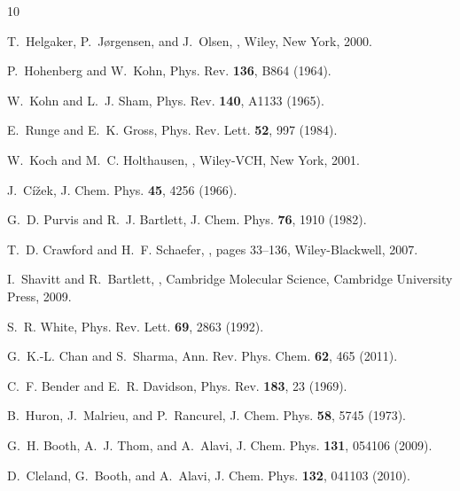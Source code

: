 \documentclass[aps,prl,twocolumn,showpacs,superscriptaddress,groupedaddress]{revtex4}  %
\begin{document}
% 
% 
\begin{thebibliography}{10}

T.~Helgaker, P.~J\o{}rgensen, and J.~Olsen,
,
\newblock Wiley, New York, 2000.

P.~Hohenberg and W.~Kohn,
\newblock Phys. Rev. {\bf 136}, B864 (1964).

W.~Kohn and L.~J. Sham,
\newblock Phys. Rev. {\bf 140}, A1133 (1965).

E.~Runge and E.~K. Gross,
\newblock Phys. Rev. Lett. {\bf 52}, 997 (1984).

W.~Koch and M.~C. Holthausen,
,
\newblock Wiley-VCH, New York, 2001.

J.~C\'i\v{z}ek,
\newblock J. Chem. Phys. {\bf 45}, 4256 (1966).

G.~D. Purvis and R.~J. Bartlett,
\newblock J. Chem. Phys. {\bf 76}, 1910 (1982).

T.~D. Crawford and H.~F. Schaefer,
, pages 33--136,
\newblock Wiley-Blackwell, 2007.

I.~Shavitt and R.~Bartlett,
,
\newblock Cambridge Molecular Science, Cambridge University Press, 2009.

S.~R. White,
\newblock Phys. Rev. Lett. {\bf 69}, 2863 (1992).

G.~K.-L. Chan and S.~Sharma,
\newblock Ann. Rev. Phys. Chem. {\bf 62}, 465 (2011).

C.~F. Bender and E.~R. Davidson,
\newblock Phys. Rev. {\bf 183}, 23 (1969).

B.~Huron, J.~Malrieu, and P.~Rancurel,
\newblock J. Chem. Phys. {\bf 58}, 5745 (1973).

G.~H. Booth, A.~J. Thom, and A.~Alavi,
\newblock J. Chem. Phys. {\bf 131}, 054106 (2009).

D.~Cleland, G.~Booth, and A.~Alavi,
\newblock J. Chem. Phys. {\bf 132}, 041103 (2010).


\end{thebibliography}
\end{document}
